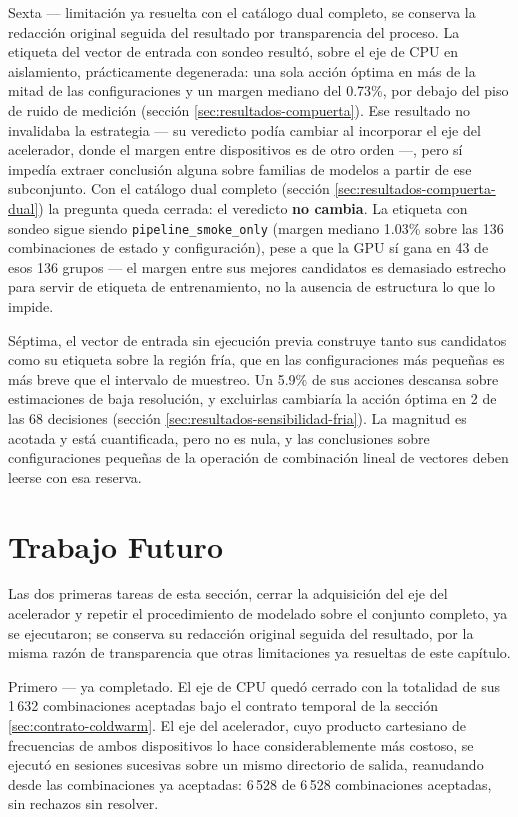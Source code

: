 \documentclass[12pt,oneside,spanish]{book}
\begin{document}
Sexta --- limitación ya resuelta con el catálogo dual completo, se conserva la redacción original seguida del resultado por transparencia del proceso. La etiqueta del vector de entrada con sondeo resultó, sobre el eje de CPU en aislamiento, prácticamente degenerada: una sola acción óptima en más de la mitad de las configuraciones y un margen mediano del 0.73\%, por debajo del piso de ruido de medición (sección \ref{sec:resultados-compuerta}). Ese resultado no invalidaba la estrategia --- su veredicto podía cambiar al incorporar el eje del acelerador, donde el margen entre dispositivos es de otro orden ---, pero sí impedía extraer conclusión alguna sobre familias de modelos a partir de ese subconjunto. Con el catálogo dual completo (sección \ref{sec:resultados-compuerta-dual}) la pregunta queda cerrada: el veredicto \textbf{no cambia}. La etiqueta con sondeo sigue siendo \texttt{pipeline\_smoke\_only} (margen mediano 1.03\% sobre las 136 combinaciones de estado y configuración), pese a que la GPU sí gana en 43 de esos 136 grupos --- el margen entre sus mejores candidatos es demasiado estrecho para servir de etiqueta de entrenamiento, no la ausencia de estructura lo que lo impide.

Séptima, el vector de entrada sin ejecución previa construye tanto sus candidatos como su etiqueta sobre la región fría, que en las configuraciones más pequeñas es más breve que el intervalo de muestreo. Un 5.9\% de sus acciones descansa sobre estimaciones de baja resolución, y excluirlas cambiaría la acción óptima en 2 de las 68 decisiones (sección \ref{sec:resultados-sensibilidad-fria}). La magnitud es acotada y está cuantificada, pero no es nula, y las conclusiones sobre configuraciones pequeñas de la operación de combinación lineal de vectores deben leerse con esa reserva.

\section{Trabajo Futuro}

Las dos primeras tareas de esta sección, cerrar la adquisición del eje del acelerador y repetir el procedimiento de modelado sobre el conjunto completo, ya se ejecutaron; se conserva su redacción original seguida del resultado, por la misma razón de transparencia que otras limitaciones ya resueltas de este capítulo.

Primero --- ya completado. El eje de CPU quedó cerrado con la totalidad de sus 1\,632 combinaciones aceptadas bajo el contrato temporal de la sección \ref{sec:contrato-coldwarm}. El eje del acelerador, cuyo producto cartesiano de frecuencias de ambos dispositivos lo hace considerablemente más costoso, se ejecutó en sesiones sucesivas sobre un mismo directorio de salida, reanudando desde las combinaciones ya aceptadas: 6\,528 de 6\,528 combinaciones aceptadas, sin rechazos sin resolver.
\end{document}
